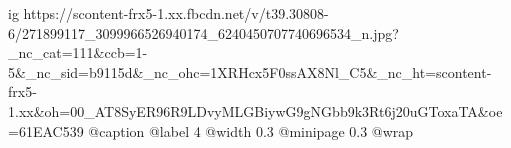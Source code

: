  
 
 
 
 

\ifcmt
  ig https://scontent-frx5-1.xx.fbcdn.net/v/t39.30808-6/271899117_3099966526940174_6240450707740696534_n.jpg?_nc_cat=111&ccb=1-5&_nc_sid=b9115d&_nc_ohc=1XRHcx5F0ssAX8Nl_C5&_nc_ht=scontent-frx5-1.xx&oh=00_AT8SyER96R9LDvyMLGBiywG9gNGbb9k3Rt6j20uGToxaTA&oe=61EAC539
  @caption @label 4
  @width 0.3
  @minipage 0.3
  @wrap \parpic[r]
\fi
